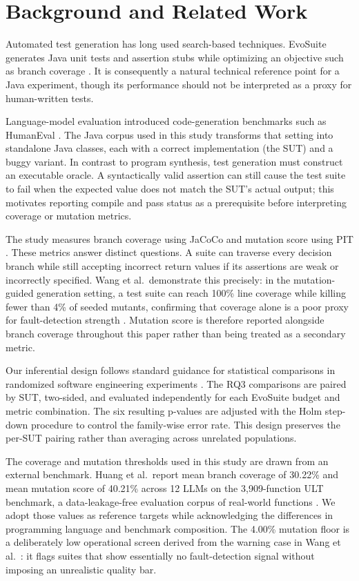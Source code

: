 \section{Background and Related Work}
\label{sec:related}

Automated test generation has long used search-based techniques. EvoSuite generates Java unit tests and assertion stubs while optimizing an objective such as branch coverage \cite{Tang_2024}. It is consequently a natural technical reference point for a Java experiment, though its performance should not be interpreted as a proxy for human-written tests.

Language-model evaluation introduced code-generation benchmarks such as HumanEval \cite{chen2021codex}. The Java corpus used in this study transforms that setting into standalone Java classes, each with a correct implementation (the SUT) and a buggy variant. In contrast to program synthesis, test generation must construct an executable oracle. A syntactically valid assertion can still cause the test suite to fail when the expected value does not match the SUT's actual output; this motivates reporting compile and pass status as a prerequisite before interpreting coverage or mutation metrics.

The study measures branch coverage using JaCoCo \cite{Lu_2026} and mutation score using PIT \cite{Bouafif_2025}. These metrics answer distinct questions. A suite can traverse every decision branch while still accepting incorrect return values if its assertions are weak or incorrectly specified. Wang et al.\ demonstrate this precisely: in the mutation-guided generation setting, a test suite can reach 100\% line coverage while killing fewer than 4\% of seeded mutants, confirming that coverage alone is a poor proxy for fault-detection strength \cite{wang2026mutgen}. Mutation score is therefore reported alongside branch coverage throughout this paper rather than being treated as a secondary metric.

Our inferential design follows standard guidance for statistical comparisons in randomized software engineering experiments \cite{evaluating2024}. The RQ3 comparisons are paired by SUT, two-sided, and evaluated independently for each EvoSuite budget and metric combination. The six resulting p-values are adjusted with the Holm step-down procedure to control the family-wise error rate. This design preserves the per-SUT pairing rather than averaging across unrelated populations.

The coverage and mutation thresholds used in this study are drawn from an external benchmark. Huang et al.\ report mean branch coverage of 30.22\% and mean mutation score of 40.21\% across 12 LLMs on the 3,909-function ULT benchmark, a data-leakage-free evaluation corpus of real-world functions \cite{huang2026ult}. We adopt those values as reference targets while acknowledging the differences in programming language and benchmark composition. The 4.00\% mutation floor is a deliberately low operational screen derived from the warning case in Wang et al.\ \cite{wang2026mutgen}: it flags suites that show essentially no fault-detection signal without imposing an unrealistic quality bar.

